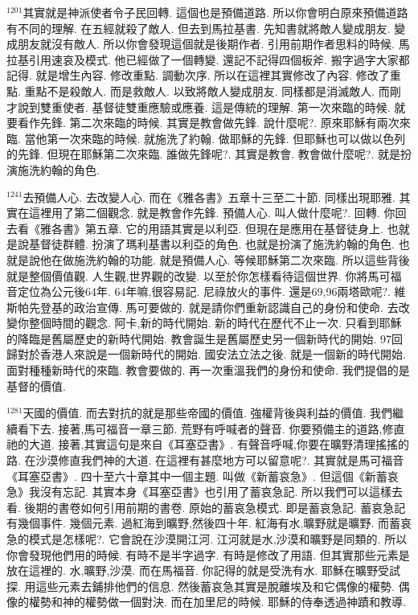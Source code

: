 \documentclass{book}
\begin{document}
$^{1201}$其實就是神派使者令子民回轉.
這個也是預備道路.
所以你會明白原來預備道路有不同的理解.
在五經就殺了敵人.
但去到馬拉基書.
先知書就將敵人變成朋友.
變成朋友就沒有敵人.
所以你會發現這個就是後期作者.
引用前期作者思料的時候.
馬拉基引用速哀及模式.
他已經做了一個轉變.
還記不記得四個板斧.
搬字過字大家都記得.
就是增生內容.
修改重點.
調動次序.
所以在這裡其實修改了內容.
修改了重點.
重點不是殺敵人.
而是救敵人.
以致將敵人變成朋友.
同樣都是消滅敵人.
而剛才說到雙重使者.
基督徒雙重應驗或應養.
這是傳統的理解.
第一次來臨的時候.
就要看作先鋒.
第二次來臨的時候.
其實是教會做先鋒.
說什麼呢?.
原來耶穌有兩次來臨.
當他第一次來臨的時候.
就施洗了約翰.
做耶穌的先鋒.
但耶穌也可以做以色列的先鋒.
但現在耶穌第二次來臨.
誰做先鋒呢?.
其實是教會.
教會做什麼呢?.
就是扮演施洗約翰的角色.

$^{1241}$去預備人心.
去改變人心.
而在《雅各書》五章十三至二十節.
同樣出現耶雅.
其實在這裡用了第二個觀念.
就是教會作先鋒.
預備人心.
叫人做什麼呢?.
回轉.
你回去看《雅各書》第五章.
它的用語其實是以利亞.
但現在是應用在基督徒身上.
也就是說基督徒群體.
扮演了瑪利基書以利亞的角色.
也就是扮演了施洗約翰的角色.
也就是說他在做施洗約翰的功能.
就是預備人心.
等候耶穌第二次來臨.
所以這些背後就是整個價值觀.
人生觀,世界觀的改變.
以至於你怎樣看待這個世界.
你將馬可福音定位為公元後64年.
64年嘛,很容易記.
尼祿放火的事件.
還是69,96兩塔歐呢?.
維斯帕先登基的政治宣傳.
馬可要做的.
就是請你們重新認識自己的身份和使命.
去改變你整個時間的觀念.
阿卡,新的時代開始.
新的時代在歷代不止一次.
只看到耶穌的降臨是舊屬歷史的新時代開始.
教會誕生是舊屬歷史另一個新時代的開始.
97回歸對於香港人來說是一個新時代的開始.
國安法立法之後.
就是一個新的時代開始.
面對種種新時代的來臨.
教會要做的.
再一次重溫我們的身份和使命.
我們提倡的是基督的價值.

$^{1281}$天國的價值.
而去對抗的就是那些帝國的價值.
強權背後與利益的價值.
我們繼續看下去.
接著,馬可福音一章三節.
荒野有呼喊者的聲音.
你要預備主的道路,修直祂的大道.
接著,其實這句是來自《耳塞亞書》.
有聲音呼喊,你要在曠野清理搖搖的路.
在沙漠修直我們神的大道.
在這裡有甚麼地方可以留意呢?.
其實就是馬可福音《耳塞亞書》.
四十至六十章其中一個主題.
叫做《新蓄哀急》.
但這個《新蓄哀急》我沒有忘記.
其實本身《耳塞亞書》也引用了蓄哀急記.
所以我們可以這樣去看.
後期的書卷如何引用前期的書卷.
原始的蓄哀急模式.
即是蓄哀急記.
蓄哀急記有幾個事件.
幾個元素.
過紅海到曠野,然後四十年.
紅海有水,曠野就是曠野.
而蓄哀急的模式是怎樣呢?.
它會說在沙漠開江河.
江河就是水,沙漠和曠野是同類的.
所以你會發現他們用的時候.
有時不是半字過字.
有時是修改了用語.
但其實那些元素是放在這裡的.
水,曠野,沙漠.
而在馬福音.
你記得的就是受洗有水.
耶穌在曠野受試探.
用這些元素去鋪排他們的信息.
然後蓄哀急其實是脫離埃及和它偶像的權勢.
偶像的權勢和神的權勢做一個對決.
而在加里尼的時候.
耶穌的侍奉透過神蹟和教導.
\end{document}
